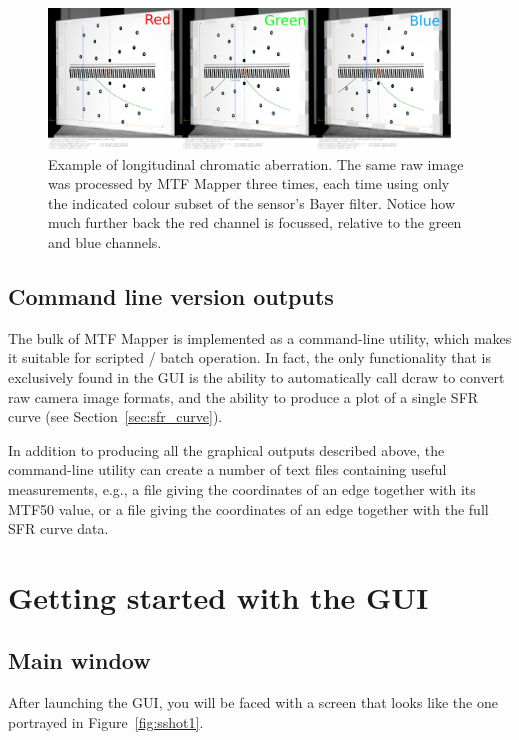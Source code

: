 \documentclass[a4paper]{article}
\begin{document}
\begin{figure}[!ht]
\centering
\includegraphics[width=0.95\textwidth]{figures/loca_example}
\caption{Example of longitudinal chromatic aberration. The same raw image
was processed by MTF Mapper three times, each time using only the indicated
colour subset of the sensor's Bayer filter. Notice how much
further back the red channel is focussed, relative to the green and blue
channels.}
\label{fig:loca_example}
\end{figure}

\subsection{Command line version outputs}
The bulk of MTF Mapper is implemented as a command-line utility, which makes
it suitable for scripted / batch operation. In fact, the only functionality
that is exclusively found in the GUI is the ability to automatically call dcraw to
convert raw camera image formats, and the ability to produce a plot of a
single SFR curve (see Section~\ref{sec:sfr_curve}).

In addition to producing all the graphical outputs described above, the
command-line utility can create a number of text files containing useful
measurements, e.g., a file giving the coordinates of an edge together with
its MTF50 value, or a file giving the coordinates of an edge together with
the full SFR curve data.

\newpage

\section{Getting started with the GUI}
\subsection{Main window}
After launching the GUI, you will be faced with a screen that looks like the
one portrayed in Figure~\ref{fig:sshot1}.
\end{document}
